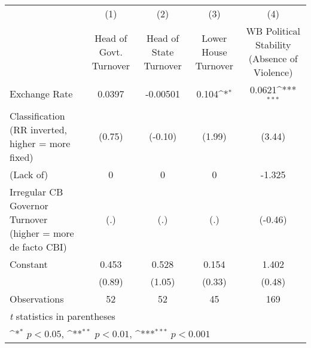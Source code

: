 {
\def\sym#1{\ifmmode^{#1}\else\(^{#1}\)\fi}
\begin{tabular}{l*{4}{c}}
\toprule
                &\multicolumn{1}{c}{(1)}&\multicolumn{1}{c}{(2)}&\multicolumn{1}{c}{(3)}&\multicolumn{1}{c}{(4)}\\
                &\multicolumn{1}{c}{Head of Govt. Turnover}&\multicolumn{1}{c}{Head of State Turnover}&\multicolumn{1}{c}{Lower House Turnover}&\multicolumn{1}{c}{WB Political Stability (Absence of Violence)}\\
\midrule
Exchange Rate   &   0.0397         & -0.00501         &    0.104\sym{*}  &   0.0621\sym{***}\\
Classification (RR inverted, higher = more fixed)&   (0.75)         &  (-0.10)         &   (1.99)         &   (3.44)         \\
\addlinespace
(Lack of)       &        0         &        0         &        0         &   -1.325         \\
Irregular CB Governor Turnover (higher = more de facto CBI)&      (.)         &      (.)         &      (.)         &  (-0.46)         \\
\addlinespace
Constant        &    0.453         &    0.528         &    0.154         &    1.402         \\
                &   (0.89)         &   (1.05)         &   (0.33)         &   (0.48)         \\
\midrule
Observations    &       52         &       52         &       45         &      169         \\
\bottomrule
\multicolumn{5}{l}{\footnotesize \textit{t} statistics in parentheses}\\
\multicolumn{5}{l}{\footnotesize \sym{*} \(p<0.05\), \sym{**} \(p<0.01\), \sym{***} \(p<0.001\)}\\
\end{tabular}
}
